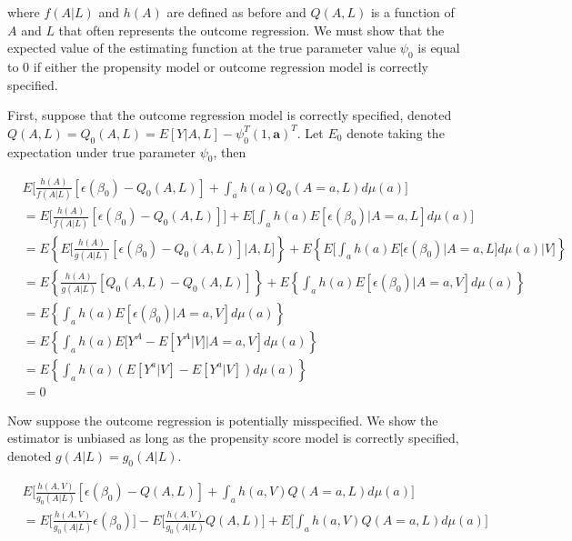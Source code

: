 \documentclass[12pt]{article}
\begin{document}
where $f(A|L)$ and $h(A)$ are defined as before and $Q(A, L)$ is a function of $A$ and $L$ that often represents the outcome regression. We must show that the expected value of the estimating function at the true parameter value $\psi_{0}$ is equal to 0 if either the propensity model or outcome regression model is correctly specified.

First, suppose that the outcome regression model is correctly specified, denoted $Q(A, L) = Q_{0}(A, L) = E[Y | A, L] - \psi_{0}^{T}(1, \textbf{a})^{T}$. Let $E_{0}$ denote taking the expectation under true parameter $\psi_{0}$, then

\begin{align*}
&E \bigg[\frac{h(A)}{f(A | L)}[\epsilon(\beta_{0}) - Q_{0}(A, L)] + \int_{a} h(a)Q_{0}(A = a, L)d\mu (a) \bigg] \\
&= E \bigg[\frac{h(A)}{f(A | L)}[\epsilon(\beta_{0}) - Q_{0}(A, L)] \bigg] + E \bigg[\int_{a} h(a)E[\epsilon(\beta_{0}) | A = a, L]d\mu (a) \bigg] \\
&= E \left \{ E \bigg[\frac{h(A)}{g(A | L)}[\epsilon(\beta_{0}) - Q_{0}(A, L)] | A, L \bigg] \right \} + E \left \{ E \bigg[\int_{a} h(a)E[\epsilon(\beta_{0}) | A = a, L]d\mu (a) | V \bigg] \right \} \\
&= E \left \{ \frac{h(A)}{g(A | L)}[Q_{0}(A, L) - Q_{0}(A, L)] \right \} + E \left \{ \int_{a} h(a)E[\epsilon(\beta_{0}) | A = a, V]d\mu (a) \right \} \\
&= E \left \{ \int_{a} h(a)E[\epsilon(\beta_{0}) | A = a, V]d\mu (a) \right \} \\
&= E \left \{ \int_{a} h(a)E[Y^{A} - E[Y^{A} | V] | A = a, V]d\mu (a) \right \} \\
&= E \left \{ \int_{a} h(a)(E[Y^{a} | V] - E[Y^{a} |V])d\mu (a) \right \} \\
&= 0
\end{align*}


Now suppose the outcome regression is potentially misspecified. We show the estimator is unbiased as long as the propensity score model is correctly specified, denoted $g(A|L) = g_{0}(A|L)$.

\begin{align*}
&E \bigg[\frac{h(A, V)}{g_{0}(A | L)}[\epsilon(\beta_{0}) - Q(A, L)] + \int_{a} h(a, V)Q(A = a, L)d\mu (a) \bigg] \\
&= E \bigg[\frac{h(A, V)}{g_{0}(A | L)}\epsilon(\beta_{0}) \bigg] - E \bigg[\frac{h(A, V)}{g_{0}(A | L)}Q(A, L) \bigg] + E \bigg[ \int_{a} h(a, V)Q(A = a, L)d\mu (a) \bigg]
\end{align*}
\end{document}
